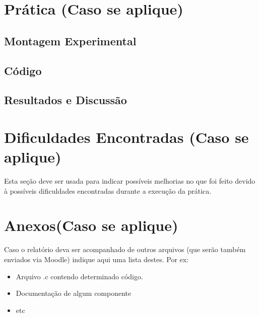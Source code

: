 \documentclass[a4paper,oneside,10pt]{article}
\begin{document}
\section{Prática (Caso se aplique)}

\subsection{Montagem Experimental}

\subsection{Código}

\subsection{Resultados e Discussão}

\section{Dificuldades Encontradas (Caso se aplique)}

Esta seção deve ser usada para indicar possíveis melhorias no que foi feito devido à possíveis dificuldades encontradas durante a execução da prática.

\section{Anexos(Caso se aplique)}

Caso o relatório deva ser acompanhado de outros arquivos (que serão também enviados via Moodle) indique aqui uma lista destes. Por ex:

\begin{itemize}
    \item Arquivo .c contendo determinado código.
    \item Documentação de algum componente
    \item etc
\end{itemize}
\end{document}
